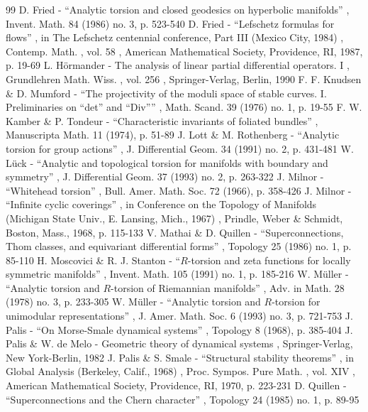 \documentclass[11pt]{article}
\numberwithin{equation}{section}
\theoremstyle{plain}
\theoremstyle{definition}
\theoremstyle{remark}
\begin{document}
\begin{thebibliography}{99}
 D. Fried - “Analytic torsion and closed geodesics on hyperbolic manifolds” , Invent. Math. 84 (1986) no. 3, p. 523-540
 D. Fried - “Lefschetz formulas for flows” , in The Lefschetz centennial conference, Part III (Mexico City, 1984) , Contemp. Math. , vol. 58 , American Mathematical Society, Providence, RI, 1987, p. 19-69
 L. Hörmander - The analysis of linear partial differential operators. I , Grundlehren Math. Wiss. , vol. 256 , Springer-Verlag, Berlin, 1990
 F. F. Knudsen \& D. Mumford - “The projectivity of the moduli space of stable curves. I. Preliminaries on “det” and “Div”” , Math. Scand. 39 (1976) no. 1, p. 19-55
 F. W. Kamber \& P. Tondeur - “Characteristic invariants of foliated bundles” , Manuscripta Math. 11 (1974), p. 51-89
 J. Lott \& M. Rothenberg - “Analytic torsion for group actions” , J. Differential Geom. 34 (1991) no. 2, p. 431-481
 W. Lück - “Analytic and topological torsion for manifolds with boundary and symmetry” , J. Differential Geom. 37 (1993) no. 2, p. 263-322
 J. Milnor - “Whitehead torsion” , Bull. Amer. Math. Soc. 72 (1966), p. 358-426
 J. Milnor - “Infinite cyclic coverings” , in Conference on the Topology of Manifolds (Michigan State Univ., E. Lansing, Mich., 1967) , Prindle, Weber \& Schmidt, Boston, Mass., 1968, p. 115-133
 V. Mathai \& D. Quillen - “Superconnections, Thom classes, and equivariant differential forms” , Topology 25 (1986) no. 1, p. 85-110
 H. Moscovici \& R. J. Stanton - “$R$-torsion and zeta functions for locally symmetric manifolds” , Invent. Math. 105 (1991) no. 1, p. 185-216
 W. Müller - “Analytic torsion and $R$-torsion of Riemannian manifolds” , Adv. in Math. 28 (1978) no. 3, p. 233-305
 W. Müller - “Analytic torsion and $R$-torsion for unimodular representations” , J. Amer. Math. Soc. 6 (1993) no. 3, p. 721-753
 J. Palis - “On Morse-Smale dynamical systems” , Topology 8 (1968), p. 385-404
 J. Palis \& W. de Melo - Geometric theory of dynamical systems , Springer-Verlag, New York-Berlin, 1982
 J. Palis \& S. Smale - “Structural stability theorems” , in Global Analysis (Berkeley, Calif., 1968) , Proc. Sympos. Pure Math. , vol. XIV , American Mathematical Society, Providence, RI, 1970, p. 223-231
 D. Quillen - “Superconnections and the Chern character” , Topology 24 (1985) no. 1, p. 89-95

\end{thebibliography}
\end{document}
